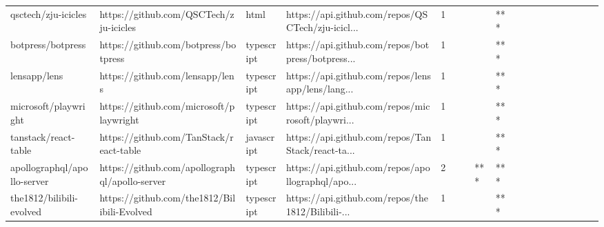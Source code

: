 \begin{tabular}{llllrlllllllllllll}
qsctech/zju-icicles                                &             https://github.com/QSCTech/zju-icicles &              html &  https://api.github.com/repos/QSCTech/zju-icicl... &       1 &         &        &           &            *** &                 &        &           &           &          &          &       &              &          \\
botpress/botpress                                  &               https://github.com/botpress/botpress &        typescript &  https://api.github.com/repos/botpress/botpress... &       1 &         &        &           &            *** &                 &        &           &           &          &          &       &              &          \\
lensapp/lens                                       &                    https://github.com/lensapp/lens &        typescript &  https://api.github.com/repos/lensapp/lens/lang... &       1 &         &        &           &            *** &                 &        &           &           &          &          &       &              &          \\
microsoft/playwright                               &            https://github.com/microsoft/playwright &        typescript &  https://api.github.com/repos/microsoft/playwri... &       1 &         &        &           &            *** &                 &        &           &           &          &          &       &              &          \\
tanstack/react-table                               &            https://github.com/TanStack/react-table &        javascript &  https://api.github.com/repos/TanStack/react-ta... &       1 &         &        &           &            *** &                 &        &           &           &          &          &       &              &          \\
apollographql/apollo-server                        &     https://github.com/apollographql/apollo-server &        typescript &  https://api.github.com/repos/apollographql/apo... &       2 &         &        &       *** &            *** &                 &        &           &           &          &          &       &              &          \\
the1812/bilibili-evolved                           &        https://github.com/the1812/Bilibili-Evolved &        typescript &  https://api.github.com/repos/the1812/Bilibili-... &       1 &         &        &           &            *** &                 &        &           &           &          &          &       &              &          \\

\end{tabular}
